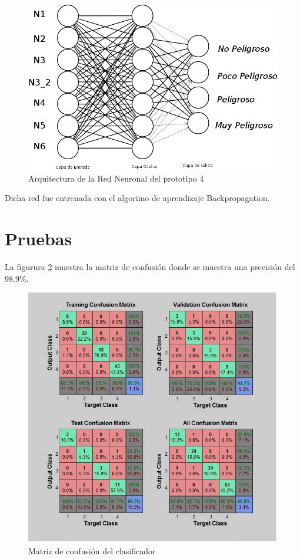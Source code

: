 \begin{figure}
\begin{center}
\includegraphics[scale=.5]{images/redneuronal}
\caption{Arquitectura de la Red Neuronal del prototipo 4}
\label{fig:redNeuronal}
\end{center}
\end{figure}

Dicha red fue entrenada con el algorimo de aprendizaje Backpropagation.

\section{Pruebas} 

La figurura \ref{fig:mconfucion} muestra la matriz de confusi\'on donde se muestra una precisi\'on del 98.9\%.

\begin{figure}[h]
\begin{center}
\includegraphics[scale=.5]{images/mcofucion}
\caption{Matriz de confusi\'on del clasificador}
\label{fig:mconfucion}
\end{center}
\end{figure}

